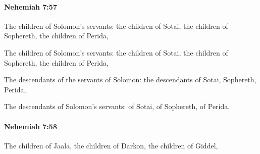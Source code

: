		\paragraph{Nehemiah 7:57} %
			\label{NEHEMIAH-7-57}

			The children of Solomon’s servants: the children of Sotai, the children of Sophereth, the children of Perida,

			\begin{versebox}
					\item[BHS] 
					\item[LXX] 
					\item[ASV] The children of Solomon's servants: the children of Sotai, the children of Sophereth, the children of Perida,
					\item[NIV] The descendants of the servants of Solomon: the descendants of Sotai, Sophereth, Perida,
					\item[NRSV] The descendants of Solomon’s servants: of Sotai, of Sophereth, of Perida,
			\end{versebox}

		\paragraph{Nehemiah 7:58} %
			\label{NEHEMIAH-7-58}

			The children of Jaala, the children of Darkon, the children of Giddel,

